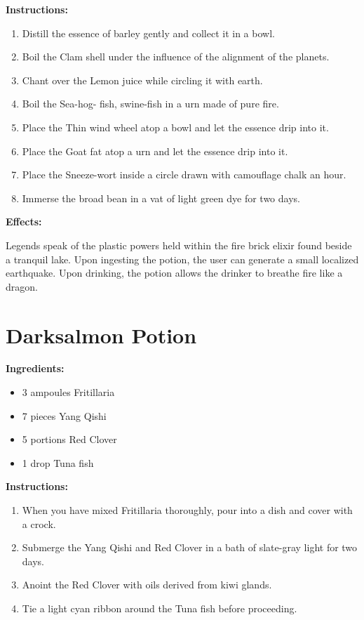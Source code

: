 \documentclass{article}
\begin{document}
\textbf{Instructions:}

\begin{enumerate}
  \item Distill the essence of barley gently and collect it in a bowl.
  \item Boil the Clam shell under the influence of the alignment of the planets.
  \item Chant over the Lemon juice while circling it with earth.
  \item Boil the Sea-hog- fish, swine-fish in a urn made of pure fire.
  \item Place the Thin wind wheel atop a bowl and let the essence drip into it.
  \item Place the Goat fat atop a urn and let the essence drip into it.
  \item Place the Sneeze-wort inside a circle drawn with camouflage chalk an hour.
  \item Immerse the broad bean in a vat of light green dye for two days.
\end{enumerate}

\textbf{Effects:}

Legends speak of the plastic powers held within the fire brick elixir found beside a tranquil lake. Upon ingesting the potion, the user can generate a small localized earthquake. Upon drinking, the potion allows the drinker to breathe fire like a dragon.

\newpage
\section*{Darksalmon Potion}

\textbf{Ingredients:}

\begin{itemize}
  \item 3 ampoules Fritillaria
  \item 7 pieces Yang Qishi
  \item 5 portions Red Clover
  \item 1 drop Tuna fish
\end{itemize}

\textbf{Instructions:}

\begin{enumerate}
  \item When you have mixed Fritillaria thoroughly, pour into a dish and cover with a crock.
  \item Submerge the Yang Qishi and Red Clover in a bath of slate-gray light for two days.
  \item Anoint the Red Clover with oils derived from kiwi glands.
  \item Tie a light cyan ribbon around the Tuna fish before proceeding.
\end{enumerate}
\end{document}
